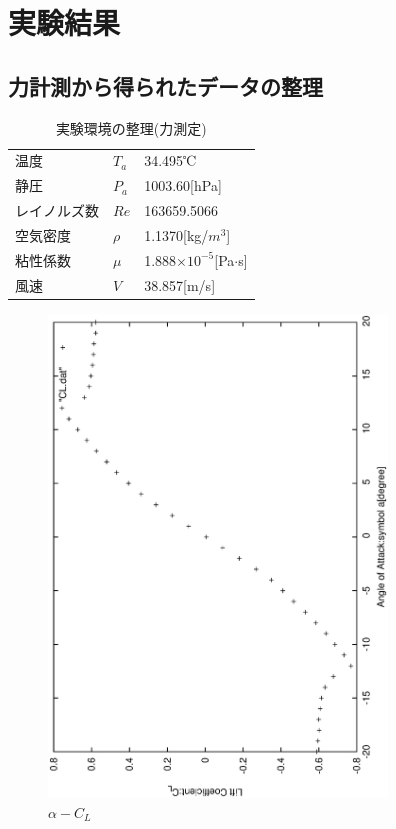 \documentclass[a4j,twoside,openright,11pt]{jarticle}
\begin{document}
\section{実験結果}
\subsection{力計測から得られたデータの整理}
\begin{table}[htb]
\begin{center}
  \caption{実験環境の整理(力測定)}
  \begin{tabular}{lll} \hline
温度        &$T_a$  &34.495℃\\
静圧        &$P_a$  &1003.60[hPa]\\
レイノルズ数&$Re$   &163659.5066\\
空気密度    &$\rho$ &1.1370[kg/$m^3$]\\
粘性係数    &$\mu$  &1.888$\times 10^{-5}$[Pa$\cdot$s]\\
風速        &$V$    &38.857[m/s]\\
\hline
  \end{tabular}
\end{center}
\end{table}

\newpage
\begin{figure}[htbp]
\begin{center}
\includegraphics[width=9cm,angle=-90]{./CL/CL.eps}
\end{center}
\caption{$\alpha - C_L$}
\end{figure}
\end{document}
